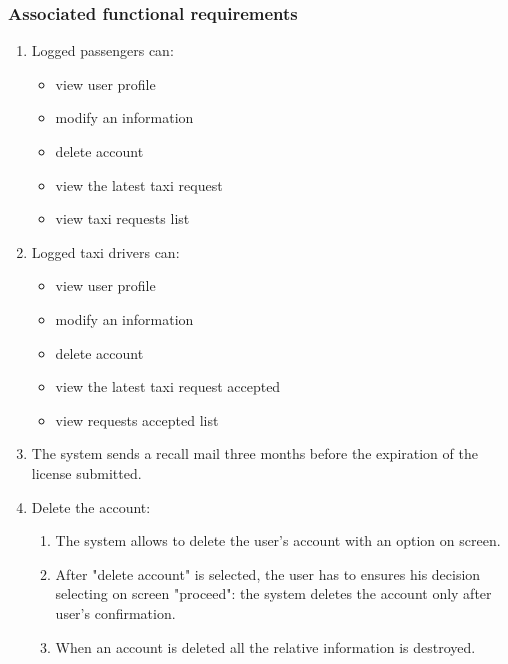 \subsubsection{Associated functional requirements}
\begin{enumerate}

\item Logged passengers can:
\begin{itemize}
\item view user profile
\item modify an information
\item delete account
\item view the latest taxi request
\item view taxi requests list
\end{itemize}

\item Logged taxi drivers can:
\begin{itemize}
\item view user profile
\item modify an information
\item delete account
\item view the latest taxi request accepted
\item view requests accepted list
\end{itemize}

\item The system sends a recall mail three months before the expiration of the license submitted.

\item Delete the account: 
\begin{enumerate}
\item The system allows to delete the user's account with an option on screen.
\item After "delete account" is selected, the user has to ensures his decision selecting on screen "proceed": the system deletes the account only after user's confirmation.
\item When an account is deleted all the relative information is destroyed.
\end{enumerate}


\end{enumerate}
